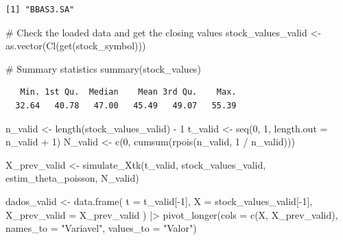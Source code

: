 \documentclass[
  letterpaper,
  DIV=11,
  numbers=noendperiod]{scrreprt}
\newenvironment{Shaded}{\begin{snugshade}}{\end{snugshade}}
\newcommand{\AttributeTok}[1]{\textcolor[rgb]{0.40,0.45,0.13}{#1}}
\newcommand{\CommentTok}[1]{\textcolor[rgb]{0.37,0.37,0.37}{#1}}
\newcommand{\DecValTok}[1]{\textcolor[rgb]{0.68,0.00,0.00}{#1}}
\newcommand{\FunctionTok}[1]{\textcolor[rgb]{0.28,0.35,0.67}{#1}}
\newcommand{\NormalTok}[1]{\textcolor[rgb]{0.00,0.23,0.31}{#1}}
\newcommand{\OtherTok}[1]{\textcolor[rgb]{0.00,0.23,0.31}{#1}}
\newcommand{\SpecialCharTok}[1]{\textcolor[rgb]{0.37,0.37,0.37}{#1}}
\newcommand{\StringTok}[1]{\textcolor[rgb]{0.13,0.47,0.30}{#1}}
\begin{document}
\begin{verbatim}
[1] "BBAS3.SA"
\end{verbatim}

\begin{Shaded}
\begin{Highlighting}[]
\CommentTok{\# Check the loaded data and get the closing values}
\NormalTok{stock\_values\_valid }\OtherTok{\textless{}{-}} \FunctionTok{as.vector}\NormalTok{(}\FunctionTok{Cl}\NormalTok{(}\FunctionTok{get}\NormalTok{(stock\_symbol)))}

\CommentTok{\# Summary statistics}
\FunctionTok{summary}\NormalTok{(stock\_values)}
\end{Highlighting}
\end{Shaded}

\begin{verbatim}
   Min. 1st Qu.  Median    Mean 3rd Qu.    Max. 
  32.64   40.78   47.00   45.49   49.07   55.39 
\end{verbatim}

\begin{Shaded}
\begin{Highlighting}[]
\NormalTok{n\_valid }\OtherTok{\textless{}{-}} \FunctionTok{length}\NormalTok{(stock\_values\_valid) }\SpecialCharTok{{-}} \DecValTok{1}
\NormalTok{t\_valid }\OtherTok{\textless{}{-}} \FunctionTok{seq}\NormalTok{(}\DecValTok{0}\NormalTok{, }\DecValTok{1}\NormalTok{, }\AttributeTok{length.out =}\NormalTok{ n\_valid }\SpecialCharTok{+} \DecValTok{1}\NormalTok{)}
\NormalTok{N\_valid }\OtherTok{\textless{}{-}} \FunctionTok{c}\NormalTok{(}\DecValTok{0}\NormalTok{, }\FunctionTok{cumsum}\NormalTok{(}\FunctionTok{rpois}\NormalTok{(n\_valid, }\DecValTok{1} \SpecialCharTok{/}\NormalTok{ n\_valid)))}
\end{Highlighting}
\end{Shaded}

\begin{Shaded}
\begin{Highlighting}[]
\NormalTok{X\_prev\_valid }\OtherTok{\textless{}{-}} \FunctionTok{simulate\_Xtk}\NormalTok{(t\_valid, stock\_values\_valid, estim\_theta\_poisson, N\_valid)}

\NormalTok{dados\_valid }\OtherTok{\textless{}{-}} \FunctionTok{data.frame}\NormalTok{(}
    \AttributeTok{t =}\NormalTok{ t\_valid[}\SpecialCharTok{{-}}\DecValTok{1}\NormalTok{],}
    \AttributeTok{X =}\NormalTok{ stock\_values\_valid[}\SpecialCharTok{{-}}\DecValTok{1}\NormalTok{],}
    \AttributeTok{X\_prev\_valid =}\NormalTok{ X\_prev\_valid}
\NormalTok{) }\SpecialCharTok{|\textgreater{}} 
\FunctionTok{pivot\_longer}\NormalTok{(}\AttributeTok{cols =} \FunctionTok{c}\NormalTok{(X, X\_prev\_valid),}
             \AttributeTok{names\_to =} \StringTok{"Variavel"}\NormalTok{,}
             \AttributeTok{values\_to =} \StringTok{"Valor"}\NormalTok{) }
\end{Highlighting}
\end{Shaded}
\end{document}
